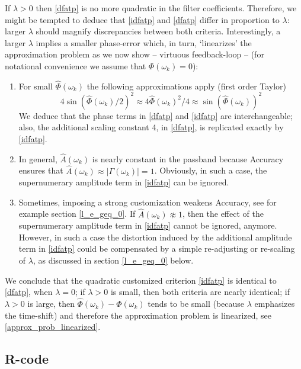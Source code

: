 \documentclass[a4paper]{book}
\begin{document}
If $\lambda>0$ then \ref{dfatp} is no more quadratic in the filter coefficients. Therefore, we might be tempted to deduce that   \ref{idfatp} and \ref{dfatp} differ in proportion to $\lambda$: larger $\lambda$ should magnify discrepancies between both criteria. Interestingly, a larger $\lambda$ implies a smaller phase-error which, in turn, `linearizes' the approximation problem as we now show --  virtuous feedback-loop -- (for notational convenience we assume that $\Phi(\omega_k)=0$):
\begin{enumerate}
\item For small $\hat{\Phi}(\omega_k)$ the following approximations apply (first order Taylor)
\begin{equation}\label{approx_prob_linearized}
4\sin(\hat{\Phi}(\omega_k)/2)^2\approx 4\hat{\Phi}(\omega_k)^2/4 \approx \sin(\hat{\Phi}(\omega_k))^2
\end{equation}
We deduce that the phase terms in \ref{dfatp} and \ref{idfatp} are interchangeable; also, the additional scaling constant 4, in \ref{dfatp}, is replicated exactly by \ref{idfatp}. 
\item In general, $\hat{A}(\omega_k)$ is nearly constant in the passband because Accuracy ensures that $\hat{A}(\omega_k)\approx|\Gamma(\omega_k)|=1$. Obviously, in such a case, the supernumerary amplitude term in \ref{idfatp} can be ignored. 
\item Sometimes, imposing a strong customization weakens Accuracy, see for example section \ref{l_e_geq_0}. If $\hat{A}(\omega_k)\not\approx 1$, then the effect of the supernumerary amplitude term in \ref{idfatp} cannot be ignored, anymore. However, in such a case the distortion induced by the additional amplitude term  in \ref{idfatp} could be compensated by a simple re-adjusting or re-scaling of $\lambda$, as discussed in section \ref{l_e_geq_0} below.
\end{enumerate}
We conclude that the quadratic customized criterion \ref{idfatp} is identical to \ref{dfatp}, when $\lambda=0$; if $\lambda>0$ is small, then both criteria are nearly identical; if $\lambda>0$ is large, then $\hat{\Phi}(\omega_k)-\Phi(\omega_k)$ tends to be small (because $\lambda$ emphasizes the time-shift) and therefore the approximation problem is linearized, see \ref{approx_prob_linearized}.





\subsection{R-code}
\end{document}
